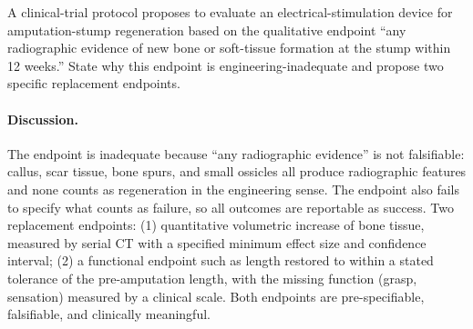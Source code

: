 \begin{exercise}
A clinical-trial protocol proposes to evaluate an
electrical-stimulation device for amputation-stump regeneration based
on the qualitative endpoint ``any radiographic evidence of new bone
or soft-tissue formation at the stump within 12 weeks.'' State why
this endpoint is engineering-inadequate and propose two specific
replacement endpoints.

\paragraph{Discussion.}
The endpoint is inadequate because ``any radiographic evidence'' is
not falsifiable: callus, scar tissue, bone spurs, and small ossicles
all produce radiographic features and none counts as regeneration in
the engineering sense. The endpoint also fails to specify what counts
as failure, so all outcomes are reportable as success. Two replacement
endpoints: (1) quantitative volumetric increase of bone tissue,
measured by serial CT with a specified minimum effect size and
confidence interval; (2) a functional endpoint such as length restored
to within a stated tolerance of the pre-amputation length, with the
missing function (grasp, sensation) measured by a clinical scale.
Both endpoints are pre-specifiable, falsifiable, and clinically
meaningful.
\end{exercise}

